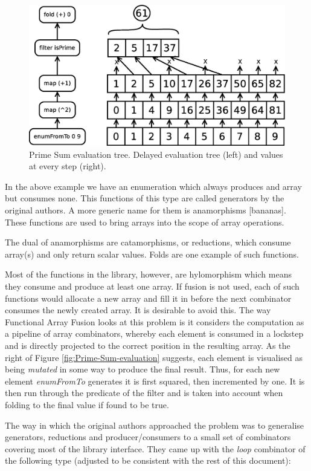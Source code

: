 \documentclass[preamble.tex]{subfiles}
\begin{document}
\begin{figure}
\includegraphics[width=1\textwidth]{img/SumPrimes}

\caption{\label{fig:Prime-Sum-evaluation}{Prime Sum evaluation tree. Delayed evaluation tree (left) and values at every step (right).}}
\end{figure}


In the above example we have an enumeration which always produces and array but consumes none. This functions of this type are called generators by the original authors. A more generic name for them is anamorphisms {[}bananas{]}. These functions are used to bring arrays into the scope of array operations.

The dual of anamorphisms are catamorphisms, or reductions, which consume array(s) and only return scalar values. Folds are one example of such functions.

Most of the functions in the library, however, are hylomorphism which means they consume and produce at least one array. If fusion is not used, each of such functions would allocate a new array and fill it in before the next combinator consumes the newly created array. It is desirable to avoid this. The way Functional Array Fusion looks at this problem is it considers the computation as a pipeline of array combinators, whereby each element is consumed in a lockstep and is directly projected to the correct position in the resulting array. As the right of Figure \vref{fig:Prime-Sum-evaluation} suggests, each element is visualised as being \emph{mutated} in some way to produce the final result. Thus, for each new element \emph{enumFromTo} generates it is first squared, then incremented by one. It is then run through the predicate of the filter and is taken into account when folding to the final value if found to be true.

The way in which the original authors approached the problem was to generalise generators, reductions and producer/consumers to a small set of combinators covering most of the library interface. They came up with the \emph{loop} combinator of the following type (adjusted to be consistent with the rest of this document):
\end{document}
